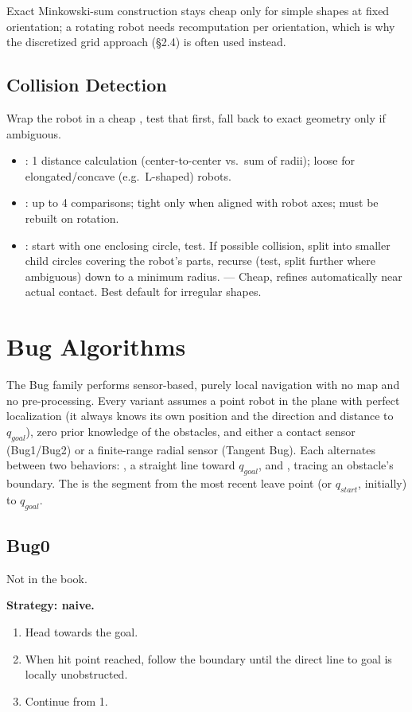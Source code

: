 Exact Minkowski-sum construction stays cheap only for simple shapes at fixed orientation; a rotating robot needs recomputation per orientation, which is why the discretized grid approach (\S2.4) is often used instead.

\subsection{Collision Detection}

Wrap the robot in a cheap , test that first, fall back to exact geometry only if ambiguous.
\begin{itemize}
\item {}: 1 distance calculation (center-to-center vs.\ sum of radii); loose for elongated/concave (e.g.\ L-shaped) robots.
\item {}: up to 4 comparisons; tight only when aligned with robot axes; must be rebuilt on rotation.
\item {}: start with one enclosing circle, test. If possible collision, split into smaller child circles covering the robot's parts, recurse (test, split further where ambiguous) down to a minimum radius. --- Cheap, refines automatically near actual contact. Best default for irregular shapes.
\end{itemize}


\section{Bug Algorithms}

The Bug family performs sensor-based, purely local navigation with no map and no pre-processing. Every variant assumes a point robot in the plane with perfect localization (it always knows its own position and the direction and distance to $q_{goal}$), zero prior knowledge of the obstacles, and either a contact sensor (Bug1/Bug2) or a finite-range radial sensor (Tangent Bug). Each alternates between two behaviors: , a straight line toward $q_{goal}$, and , tracing an obstacle's boundary. The  is the segment from the most recent leave point (or $q_{start}$, initially) to $q_{goal}$.

\subsection{Bug0}
\begin{notebox}
Not in the book.
\end{notebox}
\textbf{Strategy: naive.}
\begin{enumerate}
\item Head towards the goal.
\item When hit point reached, follow the boundary until the direct line to goal is locally unobstructed.
\item Continue from 1.
\end{enumerate}

